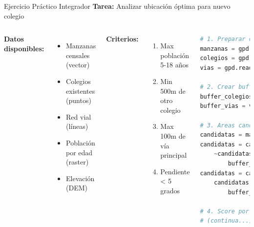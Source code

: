 \documentclass[10pt,aspectratio=169]{beamer}
\begin{document}
\begin{frame}[fragile]{Ejercicio Práctico Integrador}
    \textbf{Tarea:} Analizar ubicación óptima para nuevo colegio
    
    \vspace{0.2cm}
    
    \begin{columns}[T]
        \footnotesize
        \textbf{Datos disponibles:}
        \begin{itemize}
            \item Manzanas censales (vector)
            \item Colegios existentes (puntos)
            \item Red vial (líneas)
            \item Población por edad (raster)
            \item Elevación (DEM)
        \end{itemize}
        
        \textbf{Criterios:}
        \begin{enumerate}
            \item Max población 5-18 años
            \item Min 500m de otro colegio
            \item Max 100m de vía principal
            \item Pendiente < 5 grados
        \end{enumerate}
        
        \begin{lstlisting}[language=Python]
# 1. Preparar datos
manzanas = gpd.read_file('manzanas.shp')
colegios = gpd.read_file('colegios.geojson')
vias = gpd.read_file('vias.shp')

# 2. Crear buffers
buffer_colegios = colegios.buffer(500)
buffer_vias = vias.buffer(100)

# 3. Areas candidatas
candidatas = manzanas.copy()
candidatas = candidatas[
    ~candidatas.intersects(
        buffer_colegios.unary_union)]
candidatas = candidatas[
    candidatas.intersects(
        buffer_vias.unary_union)]

# 4. Score por poblacion
# (continua...)
        \end{lstlisting}
    \end{columns}
\end{frame}
\end{document}
